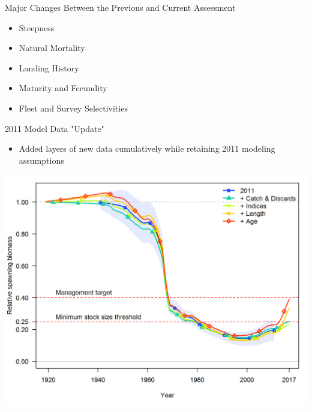 \documentclass[pdf]{beamer}\usepackage[]{graphicx}\usepackage[]{color}
\begin{document}
\begin{frame}{Major Changes Between the Previous and Current Assessment}
  \begin{itemize}
    \item Steepness 
    \item Natural Mortality
    \item Landing History
    \item Maturity and Fecundity
    \item Fleet and Survey Selectivities 
  \end{itemize}
\end{frame}

\begin{frame}{2011 Model Data "Update"}
  \begin{itemize}
    \item Added layers of new data cumulatively while retaining 2011 modeling assumptions
  \end{itemize}
  \begin{center}
    \includegraphics[scale = 0.42]{figures/Data_Bratio_uncertainty.png}
  \end{center}
\end{frame}
\end{document}
